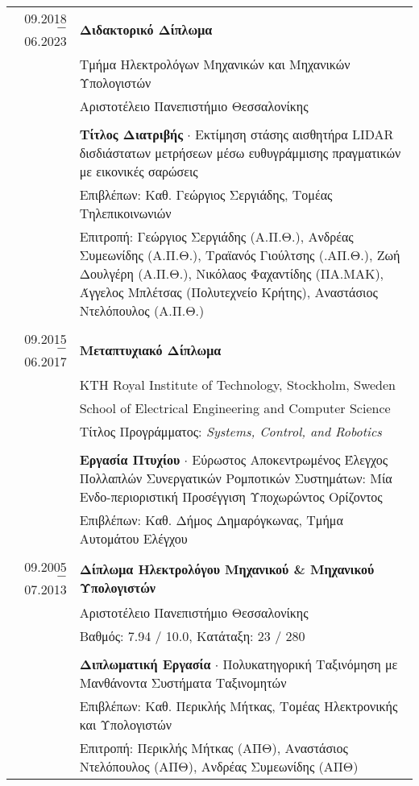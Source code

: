 \documentclass[a4paper,10pt,twoside]{article}
\begin{document}
\begin{tabular}{rp{11cm}}
09.2018 $-$ 06.2023 & \textbf{Διδακτορικό Δίπλωμα} \\
                    & Τμήμα Ηλεκτρολόγων Μηχανικών και Μηχανικών Υπολογιστών \\
                    & Αριστοτέλειο Πανεπιστήμιο Θεσσαλονίκης \\

&\\                 & \textbf{Τίτλος Διατριβής} $\cdot$ Εκτίμηση στάσης αισθητήρα LIDAR δισδιάστατων μετρήσεων μέσω ευθυγράμμισης πραγματικών με εικονικές σαρώσεις\\
                    & Επιβλέπων: Καθ. Γεώργιος Σεργιάδης, Τομέας Τηλεπικοινωνιών\\
                    & Επιτροπή: Γεώργιος Σεργιάδης (Α.Π.Θ.), Ανδρέας Συμεωνίδης (Α.Π.Θ.), Τραϊανός Γιούλτσης (.ΑΠ.Θ.), Ζωή Δουλγέρη (Α.Π.Θ.), Νικόλαος Φαχαντίδης (ΠΑ.ΜΑΚ), Άγγελος Μπλέτσας (Πολυτεχνείο Κρήτης), Αναστάσιος Ντελόπουλος (Α.Π.Θ.) \\

&\\
09.2015 $-$ 06.2017 & \textbf{Μεταπτυχιακό Δίπλωμα} \\
                    & KTH Royal Institute of Technology, Stockholm, Sweden\\
                    & School of Electrical Engineering and Computer Science\\
                    & Τίτλος Προγράμματος: \textit{Systems, Control, and Robotics}\\

&\\                 & \textbf{Εργασία Πτυχίου} $\cdot$ Εύρωστος Αποκεντρωμένος Έλεγχος Πολλαπλών Συνεργατικών Ρομποτικών Συστημάτων: Μία Ενδο-περιοριστική
                      Προσέγγιση Υποχωρώντος Ορίζοντος \\
                    & Επιβλέπων: Καθ. Δήμος Δημαρόγκωνας, Τμήμα Αυτομάτου Ελέγχου\\
&\\
09.2005 $-$ 07.2013 & \textbf{Δίπλωμα Ηλεκτρολόγου Μηχανικού \& Μηχανικού Υπολογιστών} \\
                    & Αριστοτέλειο Πανεπιστήμιο Θεσσαλονίκης \\
                    & Βαθμός: 7.94 / 10.0, Κατάταξη: 23 / 280 \\
&\\
                    & \textbf{Διπλωματική Εργασία} $\cdot$ Πολυκατηγορική Ταξινόμηση με Μανθάνοντα Συστήματα Ταξινομητών\\
                    & Επιβλέπων: Καθ. Περικλής Μήτκας, Τομέας Ηλεκτρονικής και Υπολογιστών\\
                    & Επιτροπή: Περικλής Μήτκας (ΑΠΘ), Αναστάσιος Ντελόπουλος (ΑΠΘ), Ανδρέας Συμεωνίδης (ΑΠΘ) \\
\end{tabular}\\
\end{document}

